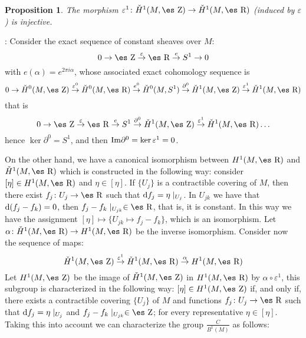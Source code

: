 \documentclass[12pt]{article}
\theoremstyle{plain}
\newtheorem{prop}{Proposition}
\def\dst{\(}
\def\map#1{\mathrel{\mathop{\to}\limits^{#1}}}
\def\qed{\ifvmode\removelastskip\fi
{\unskip\nobreak\hfil\penalty50\hbox{}\nobreak\hfil
\hbox{\vrule height1.2ex width1.2ex}\parfillskip=0pt
\finalhyphendemerits=0 \par\smallskip}}
\def\d{{\rm d}}
\def\Zahl{\mbox{\es Z}}
\def\Real{\mbox{\es R}}
\begin{document}
\begin{prop}
The morphism
$\varepsilon^1 \colon \check H^1(M,\Zahl ) \to \check H^1(M,\Real )$
(induced by $\varepsilon$) is injective.
\end{prop}
: 
Consider the exact sequence of constant sheaves over $M$:
$$
0 \to \Zahl \map{\varepsilon} \Real \map{e} S^1 \to 0
$$
with $e(\alpha )= e^{2\pi i \alpha}$,
whose associated exact cohomology sequence is
$$
0 \to \check H^0(M,\Zahl ) \map{\varepsilon^0}
\check H^0(M,\Real ) \map{e^0}
\check H^0(M,S^1) \map{\partial^0}
\check H^1(M,\Zahl ) \map{\varepsilon^1}
\check H^1(M,\Real )
$$
that is
$$
0 \to \Zahl \map{\varepsilon} \Real \map{e} S^1
\map{\partial^0}
\check H^1(M,\Zahl ) \map{\varepsilon^1}
\check H^1(M,\Real ) \ldots
$$
hence $\ker \partial^0 = S^1$, and then
${\rm Im} \partial^0 =\ker \varepsilon^1 = 0$.
\qed

On the other hand,
we have a  canonical isomorphism between
$H^1(M,\Real )$ and $\check H^1(M,\Real )$
which is constructed in the following way:
consider $[\eta ] \in H^1(M,\Real )$
and $\eta \in [\eta ]$.
If $\{ U_j \}$ is a contractible covering of $M$, then there exist
$f_j \colon U_j \to \Real$ such that $\d f_j = \eta\mid_{U_j}$.
In $U_{jk}$ we have that $\d (f_j - f_k) = 0$,
then $f_j-f_k \mid_{U_{jk}} \in \Real$, that is, it is constant.
In this way we have the assignment
$[\eta] \mapsto \{ U_{jk} \mapsto f_j - f_k \}$, which is an
isomorphism.
Let $\alpha \colon \check H^1(M,\Real ) \to H^1(M,\Real )$ be
the inverse isomorphism.
Consider now the sequence of maps:
$$
\check H^1(M,\Zahl ) \map{\varepsilon^1}
\check H^1(M,\Real ) \map{\alpha}
H^1(M,\Real )
$$
Let $H^1(M,\Zahl )$ be the image of
$\check H^1(M,\Zahl )$ in $H^1(M,\Real )$
by $\alpha \circ \varepsilon^1$,
this subgroup is characterized in the following way:
$[\eta ] \in H^1(M,\Zahl )$ if, and only if, there exists a contractible
covering
$\{ U_j \}$ of $M$ and functions $f_j \colon U_j \to \Real$ such that
$\d f_j = \eta \mid_{U_j}$ and $f_j-f_k \mid_{U_{jk}} \in \Zahl$;
for every representative $\eta \in [\eta ]$.
Taking this into account we can characterize the group
\dst\frac{C}{B^1(M)}\) as follows:
\end{document}
